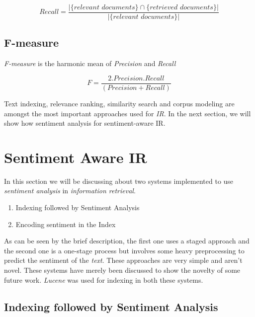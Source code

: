\begin{equation}
 Recall = \frac{|\{\textit{relevant documents}\} \cap \{\textit{retrieved documents}\}|}{|\{\textit{relevant documents}\}|}
\end{equation}

\subsection*{F-measure}

\textit{F-measure} is the harmonic mean of \textit{Precision} and \textit{Recall}

\begin{equation}
 F = \frac{2.Precision.Recall}{(Precision+Recall)}
\end{equation}

\par

Text indexing, relevance ranking, similarity search and corpus modeling are amongst the most important approaches used for 
\textit{IR}. In the next section, we will show how sentiment analysis for sentiment-aware IR.

\section{Sentiment Aware IR}

In this section we will be discussing about two systems implemented to use \textit{sentiment analysis} in \textit{information retrieval}.

\begin{enumerate}
 \item Indexing followed by Sentiment Analysis
 \item Encoding sentiment in the Index
\end{enumerate}

As can be seen by the brief description, the first one uses a staged approach and the second one is a one-stage process but involves
some heavy preprocessing to predict the sentiment of the \textit{text}. These approaches are very simple and aren't novel.
These systems have merely been discussed to show the novelty of some future work. \textit{Lucene} \citep*{apachelucene} was used for indexing
in both these systems.

\subsection{Indexing followed by Sentiment Analysis}

